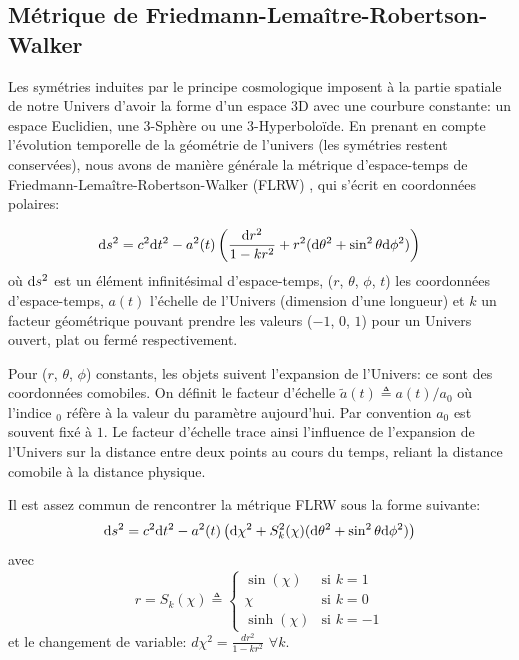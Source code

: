 \documentclass[../main/main.tex]{subfiles}
\begin{document}
\subsection{Métrique de Friedmann-Lemaître-Robertson-Walker}\label{ssec:FLRW}

Les symétries induites par le principe cosmologique imposent à la partie
spatiale de notre Univers d'avoir la forme d'un espace 3D avec une
courbure constante: un espace Euclidien, une 3-Sphère ou une
3-Hyperboloïde. En prenant en compte l'évolution temporelle de la
géométrie de l'univers (les symétries restent conservées), nous avons de
manière générale la métrique d'espace-temps de Friedmann-Lemaître-Robertson-Walker (FLRW)
\citep{Friedmann1922,Lemaitre1933,Robertson1936,Walker1937}, qui s'écrit
en coordonnées polaires:

\begin{equation}
  \label{eq:FLRW}
  \mathrm{d} s^{2}=c^{2}\mathrm{d} t^{2}-a^{2}(t)\left( \frac{\mathrm{d} r^{2}}{1-kr^{2}}+r^{2}(\mathrm{d}\theta^{2}+\sin^{2}\theta\mathrm{d}\phi^{2})\right)
\end{equation}
où $\mathrm{d} s^{2}$ est un élément infinitésimal d'espace-temps, ($r$,
$\theta$, $\phi$, $t$) les coordonnées d'espace-temps, $a(t)$ \og
l'échelle\fg{} de l'Univers (dimension d'une longueur) et $k$ un facteur géométrique pouvant prendre les
valeurs ($-1$, $0$, $1$) pour un Univers ouvert, plat ou fermé
respectivement.

Pour ($r$, $\theta$, $\phi$) constants, les objets
suivent l'expansion de l'Univers: ce sont des coordonnées comobiles.
On définit le facteur d'échelle $\tilde{a}(t)\triangleq a(t)/a_{0}$ où
l'indice $_{0}$ réfère à la valeur du paramètre aujourd'hui. Par
convention $a_{0}$ est souvent fixé à $1$. Le
facteur d'échelle trace
ainsi l'influence de l'expansion de l'Univers sur la distance entre deux
points au cours du temps, reliant la distance comobile à la distance
physique.

Il est assez commun de rencontrer la métrique FLRW sous la forme
suivante:
\begin{equation}
  \label{eq:FLRW2}
  \mathrm{d} s^{2}=c^{2}\mathrm{d} t^{2}-a^{2}(t) \left( \mathrm{d}\chi^{2}+S^{2}_{k}(\chi)(\mathrm{d}\theta^{2}+\sin^{2}\theta \mathrm{d}\phi^{2}) \right)
\end{equation}
avec 
\begin{equation}
  \label{eq:chiflrw}
  r=S_{k}(\chi) \triangleq
  \begin{cases}
        \sin(\chi) & \text{si }  k=1 \\
        \chi & \text{si }  k=0 \\
        \sinh(\chi) & \text{si }  k=-1
    \end{cases}
\end{equation}
et le changement de variable:  $d\chi^{2}=\frac{dr^{2}}{1-kr^{2}}$ $\forall k$.
\end{document}
